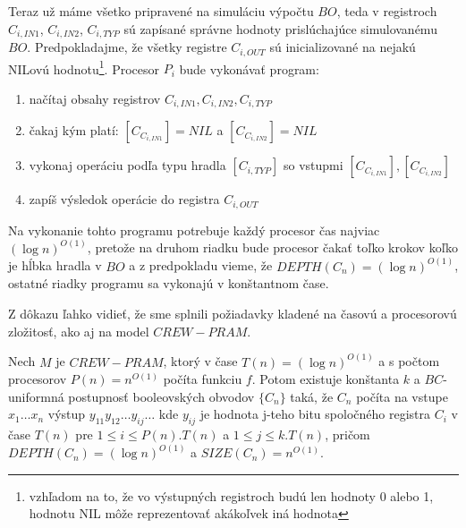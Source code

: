 \begin{dokaz}
\begin{itemize}
  Teraz už máme všetko pripravené na simuláciu výpočtu $BO$, teda
  v registroch  $C_{i,IN1}$, $C_{i,IN2}$, $C_{i,TYP}$ sú zapísané
  správne hodnoty prislúchajúce simulovanému $BO$. Predpo\-kladajme,
  že všetky registre $C_{i,OUT}$ sú inicializované na nejakú
  NILovú hodnotu\footnote{vzhľadom na to, že vo výstupných
  registroch budú len hodnoty 0 alebo 1, hodnotu NIL môže
  reprezentovať akákoľvek iná hodnota}. Procesor $P_i$ bude
  vykonávať program:
  \begin{enumerate}
    \item načítaj obsahy registrov $C_{i,IN1}, C_{i,IN2}, C_{i,TYP}$
    \item čakaj kým platí: $[C_{C_{i,IN1}}] = NIL$ a $[C_{C_{i,IN2}}] = NIL$
    \item vykonaj operáciu podľa typu hradla $[C_{i,TYP}]$ so
    vstupmi $[C_{C_{i,IN1}}], [C_{C_{i,IN2}}]$
    \item zapíš výsledok operácie do registra $C_{i,OUT}$
  \end{enumerate}
  Na vykonanie tohto programu potrebuje každý procesor čas najviac
  $(\log n)^{O(1)}$, pretože na druhom riadku bude procesor čakať
  toľko krokov koľko je hĺbka hradla v $BO$ a z predpokladu vieme, že
  $DEPTH(C_n)=(\log n)^{O(1)}$, ostatné riadky programu sa
  vykonajú v konštantnom čase.
\end{itemize}

Z dôkazu ľahko vidieť, že sme splnili požiadavky kladené na časovú
a procesorovú zložitosť, ako aj na model $CREW-PRAM$.
\end{dokaz}

\begin{veta}
Nech $M$ je $CREW-PRAM$, ktorý v čase $T(n)={(\log n)}^{O(1)}$ a s
počtom procesorov $P(n)=n^{O(1)}$ počíta funkciu $f$. Potom
existuje konštanta $k$ a $BC$-uniformná postupnosť booleovských
obvodov $\{ C_n\}$ taká, že $C_n$ počíta na vstupe $x_1\dots x_n$
výstup $y_{11}y_{12}\dots y_{ij}\dots$ kde $y_{ij}$ je hodnota
j-teho bitu spoločného registra $C_i$ v čase $T(n)$ pre $1\leq
i\leq P(n).T(n)$ a $1\leq j\leq k.T(n)$, pričom $DEPTH(C_n)={(\log
n)}^{O(1)}$ a $SIZE(C_n)=n^{O(1)}$.
\end{veta}

